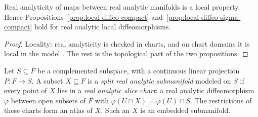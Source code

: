 \begin{corollary}
  \label{cor:local-diffeo-analytic}
  \leanok
  Real analyticity of maps between real analytic manifolds is a local property. Hence
  Propositions~\ref{prop:local-diffeo-compact} and~\ref{prop:local-diffeo-sigma-compact} hold for
  real analytic local diffeomorphisms.
\end{corollary}

\begin{proof}
  \leanok
  Locality: real analyticity is checked in charts, and on chart domains it is local in the model
  \cite[Lemma~2.2.3]{GN26}. The rest is the topological part of the two propositions.
\end{proof}

\begin{definition}
  \label{def:split-analytic-submanifold}
  \leanok
  Let $S \subseteq F$ be a complemented subspace, with a continuous linear projection $P \colon F
  \to S$. A subset $X \subseteq F$ is a \emph{split real analytic submanifold} modeled on $S$ if
  every point of $X$ lies in a \emph{real analytic slice chart}: a real analytic diffeomorphism
  $\varphi$ between open subsets of $F$ with $\varphi(U \cap X) = \varphi(U) \cap S$. The
  restrictions of these charts form an atlas of $X$. Such an $X$ is an embedded submanifold.
\end{definition}

